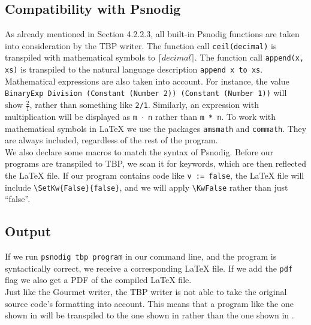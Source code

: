 \subsection{Compatibility with Psnodig}

As already mentioned in Section 4.2.2.3, all built-in Psnodig functions are taken into consideration by the TBP writer. The function call \texttt{ceil(decimal)} is transpiled with mathematical symbols to $\lceil decimal \rceil$. The function call \texttt{append(x, xs)} is transpiled to the natural language description \texttt{append x to xs}. \\

Mathematical expressions are also taken into account. For instance, the value \texttt{BinaryExp Division (Constant (Number 2)) (Constant (Number 1))} will show $\frac{2}{1}$, rather than something like \texttt{2/1}. Similarly, an expression with multiplication will be displayed as \texttt{m $\cdot$ n} rather than \texttt{m * n}. To work with mathematical symbols in LaTeX we use the packages \texttt{amsmath} and \texttt{commath}. They are always included, regardless of the rest of the program. \\

We also declare some macros to match the syntax of Psnodig. Before our programs are transpiled to TBP, we scan it for keywords, which are then reflected the LaTeX file. If our program contains code like \texttt{v := false}, the LaTeX file will include \texttt{\textbackslash SetKw\{False\}\{false\}}, and we will apply \texttt{\textbackslash KwFalse} rather than just ``false''.

\subsection{Output}

If we run \texttt{psnodig tbp program} in our command line, and the program is syntactically correct, we receive a corresponding LaTeX file. If we add the \texttt{pdf} flag we also get a PDF of the compiled LaTeX file. \\

Just like the Gourmet writer, the TBP writer is not able to take the original source code's formatting into account. This means that a program like the one shown in  will be transpiled to the one shown in  rather than the one shown in . \\

